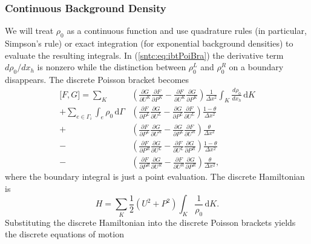 \documentclass{article}
\begin{document}
\subsubsection{Continuous Background Density}
We will treat $\rho_0$ as a continuous function and use quadrature rules (in particular, Simpson's rule) or exact integration (for exponential background densities) to evaluate the resulting integrals. In (\ref{sntc:eq:ibtPoiBra}) the derivative term $d \rho_0 /d x_h$ is nonzero while the distinction between $\rho_0^L$ and $\rho_0^R$ on a boundary disappears. The discrete Poisson bracket becomes
\begin{equation}
	\begin{aligned}
		{[}F,G{]} = \sum_K & \left(\frac{\partial G}{\partial U^K} \frac{\partial F}{\partial P^K} - \frac{\partial F}{\partial U^K} \frac{\partial G}{\partial P^K} \right) \frac{1}{\Delta x^2} \int_K \! \frac{d \rho_0}{d x_h} \, \mathrm{d}K \\
		+ \sum_{e\in\Gamma_i} \int_e \! \rho_0 \, \mathrm{d}\Gamma & \left( \frac{\partial F}{\partial P^L} \frac{\partial G}{\partial U^L}- \frac{\partial G}{\partial P^L} \frac{\partial F}{\partial U^L} \right) \frac{1-\theta}{\Delta x^2} \\
	+ & \left( \frac{\partial F}{\partial P^L} \frac{\partial G}{\partial U^R}- \frac{\partial G}{\partial P^L} \frac{\partial F}{\partial U^R} \right) \frac{\theta}{\Delta x^2} \\
	- &\left( \frac{\partial F}{\partial P^R} \frac{\partial G}{\partial U^L} - \frac{\partial F}{\partial U^L} \frac{\partial G}{\partial P^R}\right) \frac{1-\theta}{\Delta x^2} \\
	- &\left( \frac{\partial F}{\partial P^R} \frac{\partial G}{\partial U^R} - \frac{\partial F}{\partial U^R} \frac{\partial G}{\partial P^R}\right) \frac{\theta}{\Delta x^2},	
	\end{aligned}
\end{equation}
where the boundary integral is just a point evaluation. The discrete Hamiltonian 
 is
\begin{equation}
	H = \sum_K \frac{1}{2} \left(U^2 + P^2\right) \int_K \! \frac{1}{\rho_0} \, \mathrm{d}K.
\end{equation}
Substituting the discrete Hamiltonian into the discrete Poisson brackets yields the discrete equations of motion
\end{document}

